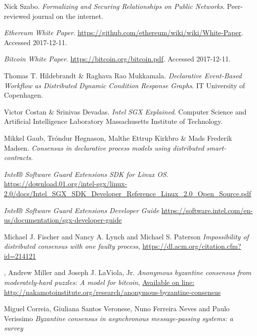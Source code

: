 \documentclass[12pt]{article}
\begin{document}
	\begin{thebibliography}{9}

		Nick Szabo.
		\textit{Formalizing and Securing Relationships on Public Networks}.
		Peer-reviewed journal on the internet.

		\textit{Ethereum White Paper}.
		\url{https://github.com/ethereum/wiki/wiki/White-Paper}.
		Accessed 2017-12-11.

		\textit{Bitcoin White Paper}.
		\url{https://bitcoin.org/bitcoin.pdf}.
		Accessed 2017-12-11.

		Thomas T. Hildebrandt \& Raghava Rao Mukkamala.
		\textit{Declarative Event-Based Workflow as Distributed Dynamic Condition Response Graphs}.
		IT University of Copenhagen.

		Victor Costan \& Srinivas Devadas.
		\textit{Intel SGX Explained}.
		Computer Science and Artificial Intelligence Laboratory Massachusetts Institute of Technology.

		Mikkel Gaub, Tróndur Høgnason, Malthe Ettrup Kirkbro \& Mads Frederik Madsen.
		\textit{Consensus in declarative process models using distributed smart-contracts}.

		\textit{Intel® Software Guard Extensions SDK for Linux OS}.
		\url{https://download.01.org/intel-sgx/linux-2.0/docs/Intel_SGX_SDK_Developer_Reference_Linux_2.0_Open_Source.pdf}

		\textit{Intel® Software Guard Extensions Developer Guide}
		\url{https://software.intel.com/en-us/documentation/sgx-developer-guide}

		Michael J. Fischer and  Nancy A. Lynch and Michael S. Paterson
		\textit{Impossibility of distributed consensus with one faulty process},
		\url{https://dl.acm.org/citation.cfm?id=214121}

		,
		Andrew Miller and Joseph J. LaViola, Jr.
  		\textit{Anonymous byzantine consensus from moderately-hard puzzles: A model for bitcoin},
		\url{Available on line: http://nakamotoinstitute.org/research/anonymous-byzantine-consensus}

		Miguel Correia, Giuliana Santos Veronese, Nuno Ferreira Neves and Paulo Verissimo
		\textit{Byzantine consensus in asynchronous message-passing systems: a survey} 


\end{thebibliography}
\end{document}
